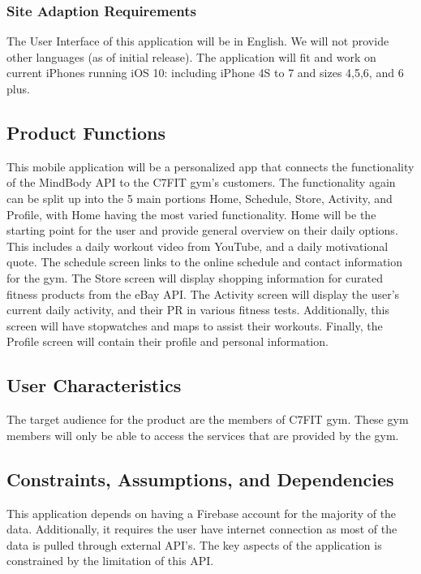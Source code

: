 \documentclass[letterpaper,10pt,titlepage]{article}
\begin{document}
\subsubsection{Site Adaption Requirements}

The User Interface of this application will be in English. We will not provide other languages (as of initial release). The application will fit and work on current iPhones running iOS 10: including iPhone 4S to 7 and sizes 4,5,6, and 6 plus.

\subsection{Product Functions}

This mobile application will be a personalized app that connects the functionality of the MindBody API to the C7FIT gym’s customers. The functionality again can be split up into the 5 main portions Home, Schedule, Store, Activity, and Profile, with Home having the most varied functionality. Home will be the starting point for the user and provide general overview on their daily options. This includes a daily workout video from YouTube, and a daily motivational quote. The schedule screen links to the online schedule and contact information for the gym. The Store screen will display shopping information for curated fitness products from the eBay API. The Activity screen will display the user’s current daily activity, and their PR in various fitness tests. Additionally, this screen will have stopwatches and maps to assist their workouts. Finally, the Profile screen will contain their profile and personal information.

\subsection{User Characteristics}

The target audience for the product are the members of C7FIT gym. These gym members will only be able to access the services that are provided by the gym.

\subsection{Constraints, Assumptions, and Dependencies}

This application depends on having a Firebase account for the majority of the data. Additionally, it requires the user have internet connection as most of the data is pulled through external API’s. The key aspects of the application is constrained by the limitation of this API.\\
\end{document}
